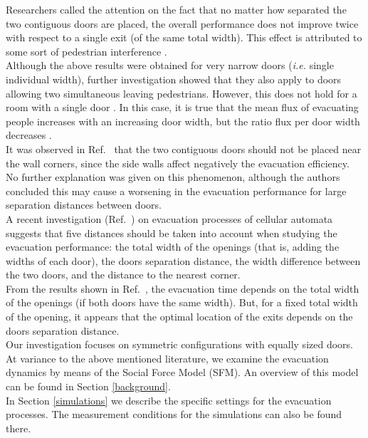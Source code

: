 Researchers called the attention on the fact that no matter how separated 
the two contiguous doors are placed, the overall performance does not improve 
twice with respect to a single exit (of the same total width). This 
effect is attributed to some sort of pedestrian interference  \cite{perez1}. 
\\

Although the above results were obtained for very narrow doors (\emph{i.e.} 
single individual width), further investigation showed that they also apply 
to doors allowing two simultaneous leaving pedestrians. However, this does 
not hold for a room with a single door \cite{daoliang1}. In this case, it is 
true that the mean flux of evacuating people increases with an increasing door 
width, but the ratio flux per door width decreases \cite{Dorso1}.   \\

It was observed in Ref.~\cite{kirchner1,daoliang1} that the two contiguous 
doors should not be placed near the wall corners, since the side walls affect 
negatively the evacuation efficiency. No further explanation was given on this 
phenomenon, although the authors concluded this may cause a worsening in the 
evacuation performance for large separation distances between doors.  \\


A recent investigation (Ref.~\cite{huanhuan1}) on evacuation processes of 
cellular automata suggests that five distances should be taken into account 
when studying the evacuation performance: the total width of the openings (that 
is, adding the widths of each door), the doors separation distance, the width 
difference between the two doors, and the distance to the nearest corner.   \\

From the results shown in Ref.~\cite{huanhuan1}, the evacuation time depends on 
the total width of the openings (if both doors have the same width). But, for 
a fixed total width of the opening, it appears that the optimal location of the 
exits depends on the doors separation distance. \\

Our investigation focuses on symmetric configurations with equally sized 
doors. At variance to the above mentioned literature, we examine the evacuation 
dynamics by means of the Social Force Model (SFM). An overview of this model 
can be found in Section \ref{background}. \\

In Section \ref{simulations} we describe the specific settings for the 
evacuation processes. The measurement conditions for the simulations can also 
be found there. \\

